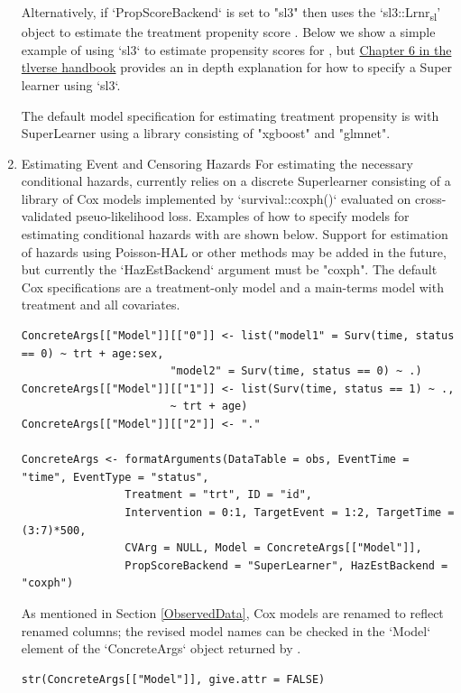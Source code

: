 \documentclass{report}
\newcommand{\1}{\ensuremath{\mathbf{1}}}
\begin{document}
\begin{enumerate}
Alternatively, if `PropScoreBackend` is set to "sl3" then  uses the `sl3::Lrnr\textsubscript{sl}' object to estimate the treatment propenity score . Below we show a simple example of using `sl3` to estimate propensity scores for , but  \href{https://tlverse.org/tlverse-handbook/sl3.html}{Chapter 6 in the tlverse handbook} provides an in depth explanation for how to specify a Super learner using `sl3`.

The default model specification for estimating treatment propensity is with SuperLearner using a library consisting of "xgboost" and "glmnet".

\item Estimating Event and Censoring Hazards
\label{HazardEstimation}
For estimating the necessary conditional hazards,  currently relies on a discrete Superlearner consisting of a library of Cox models implemented by `survival::coxph()` evaluated on cross-validated pseuo-likelihood loss. Examples of how to specify models for estimating conditional hazards with  are shown below. Support for estimation of hazards using Poisson-HAL or other methods may be added in the future, but currently the `HazEstBackend` argument must be "coxph". The default Cox specifications are a treatment-only model and a main-terms model with treatment and all covariates.  

\begin{lstlisting}
ConcreteArgs[["Model"]][["0"]] <- list("model1" = Surv(time, status == 0) ~ trt + age:sex,
				       "model2" = Surv(time, status == 0) ~ .)
ConcreteArgs[["Model"]][["1"]] <- list(Surv(time, status == 1) ~ ., 
				       ~ trt + age)
ConcreteArgs[["Model"]][["2"]] <- "."

ConcreteArgs <- formatArguments(DataTable = obs, EventTime = "time", EventType = "status", 
				Treatment = "trt", ID = "id", 
				Intervention = 0:1, TargetEvent = 1:2, TargetTime = (3:7)*500, 
				CVArg = NULL, Model = ConcreteArgs[["Model"]], 
				PropScoreBackend = "SuperLearner", HazEstBackend = "coxph")
\end{lstlisting}

As mentioned in Section \ref{ObservedData}, Cox models are renamed to reflect renamed columns; the revised model names can be checked in the `Model` element of the `ConcreteArgs` object returned by .

\begin{lstlisting}
str(ConcreteArgs[["Model"]], give.attr = FALSE)
\end{lstlisting}


\end{enumerate}
\end{document}
